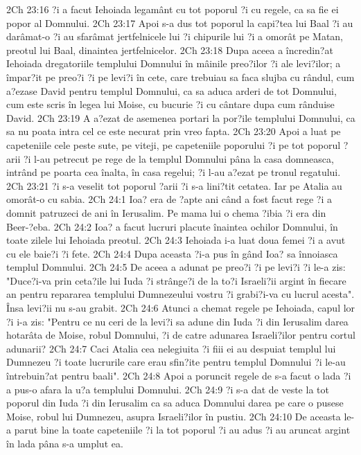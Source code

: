 2Ch 23:16  ?i a facut Iehoiada legamânt cu tot poporul ?i cu regele, ca sa fie ei popor al Domnului.
2Ch 23:17  Apoi s-a dus tot poporul la capi?tea lui Baal ?i au darâmat-o ?i au sfarâmat jertfelnicele lui ?i chipurile lui ?i a omorât pe Matan, preotul lui Baal, dinaintea jertfelnicelor.
2Ch 23:18  Dupa aceea a încredin?at Iehoiada dregatoriile templului Domnului în mâinile preo?ilor ?i ale levi?ilor; a împar?it pe preo?i ?i pe levi?i în cete, care trebuiau sa faca slujba cu rândul, cum a?ezase David pentru templul Domnului, ca sa aduca arderi de tot Domnului, cum este scris în legea lui Moise, cu bucurie ?i cu cântare dupa cum rânduise David.
2Ch 23:19  A a?ezat de asemenea portari la por?ile templului Domnului, ca sa nu poata intra cel ce este necurat prin vreo fapta.
2Ch 23:20  Apoi a luat pe capeteniile cele peste sute, pe viteji, pe capeteniile poporului ?i pe tot poporul ?arii ?i l-au petrecut pe rege de la templul Domnului pâna la casa domneasca, intrând pe poarta cea înalta, în casa regelui; ?i l-au a?ezat pe tronul regatului.
2Ch 23:21  ?i s-a veselit tot poporul ?arii ?i s-a lini?tit cetatea. Iar pe Atalia au omorât-o cu sabia.
2Ch 24:1  Ioa? era de ?apte ani când a fost facut rege ?i a domnit patruzeci de ani în Ierusalim. Pe mama lui o chema ?ibia ?i era din Beer-?eba.
2Ch 24:2  Ioa? a facut lucruri placute înaintea ochilor Domnului, în toate zilele lui Iehoiada preotul.
2Ch 24:3  Iehoiada i-a luat doua femei ?i a avut cu ele baie?i ?i fete.
2Ch 24:4  Dupa aceasta ?i-a pus în gând Ioa? sa înnoiasca templul Domnului.
2Ch 24:5  De aceea a adunat pe preo?i ?i pe levi?i ?i le-a zis: "Duce?i-va prin ceta?ile lui Iuda ?i strânge?i de la to?i Israeli?ii argint în fiecare an pentru repararea templului Dumnezeului vostru ?i grabi?i-va cu lucrul acesta". Însa levi?ii nu s-au grabit.
2Ch 24:6  Atunci a chemat regele pe Iehoiada, capul lor ?i i-a zis: "Pentru ce nu ceri de la levi?i sa adune din Iuda ?i din Ierusalim darea hotarâta de Moise, robul Domnului, ?i de catre adunarea Israeli?ilor pentru cortul adunarii?
2Ch 24:7  Caci Atalia cea nelegiuita ?i fiii ei au despuiat templul lui Dumnezeu ?i toate lucrurile care erau sfin?ite pentru templul Domnului ?i le-au întrebuin?at pentru baali".
2Ch 24:8  Apoi a poruncit regele de s-a facut o lada ?i a pus-o afara la u?a templului Domnului.
2Ch 24:9  ?i s-a dat de veste la tot poporul din Iuda ?i din Ierusalim ca sa aduca Domnului darea pe care o pusese Moise, robul lui Dumnezeu, asupra Israeli?ilor în pustiu.
2Ch 24:10  De aceasta le-a parut bine la toate capeteniile ?i la tot poporul ?i au adus ?i au aruncat argint în lada pâna s-a umplut ea.
